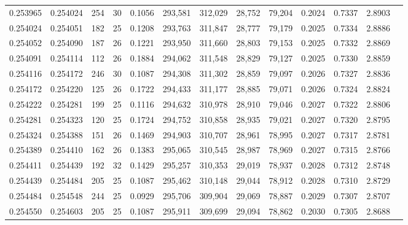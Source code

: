 \begin{tabular}{rrrrrrrrrrrrr}
0.253965 & 0.254024 &   254 &  30 &                                     0.1056 & 293,581 & 312,029 &  28,752 &  79,204 & 0.2024 & 0.7337 & 2.8903 \\
0.254024 & 0.254051 &   182 &  25 &                                     0.1208 & 293,763 & 311,847 &  28,777 &  79,179 & 0.2025 & 0.7334 & 2.8886 \\
0.254052 & 0.254090 &   187 &  26 &                                     0.1221 & 293,950 & 311,660 &  28,803 &  79,153 & 0.2025 & 0.7332 & 2.8869 \\
0.254091 & 0.254114 &   112 &  26 &                                     0.1884 & 294,062 & 311,548 &  28,829 &  79,127 & 0.2025 & 0.7330 & 2.8859 \\
0.254116 & 0.254172 &   246 &  30 &                                     0.1087 & 294,308 & 311,302 &  28,859 &  79,097 & 0.2026 & 0.7327 & 2.8836 \\
0.254172 & 0.254220 &   125 &  26 &                                     0.1722 & 294,433 & 311,177 &  28,885 &  79,071 & 0.2026 & 0.7324 & 2.8824 \\
0.254222 & 0.254281 &   199 &  25 &                                     0.1116 & 294,632 & 310,978 &  28,910 &  79,046 & 0.2027 & 0.7322 & 2.8806 \\
0.254281 & 0.254323 &   120 &  25 &                                     0.1724 & 294,752 & 310,858 &  28,935 &  79,021 & 0.2027 & 0.7320 & 2.8795 \\
0.254324 & 0.254388 &   151 &  26 &                                     0.1469 & 294,903 & 310,707 &  28,961 &  78,995 & 0.2027 & 0.7317 & 2.8781 \\
0.254389 & 0.254410 &   162 &  26 &                                     0.1383 & 295,065 & 310,545 &  28,987 &  78,969 & 0.2027 & 0.7315 & 2.8766 \\
0.254411 & 0.254439 &   192 &  32 &                                     0.1429 & 295,257 & 310,353 &  29,019 &  78,937 & 0.2028 & 0.7312 & 2.8748 \\
0.254439 & 0.254484 &   205 &  25 &                                     0.1087 & 295,462 & 310,148 &  29,044 &  78,912 & 0.2028 & 0.7310 & 2.8729 \\
0.254484 & 0.254548 &   244 &  25 &                                     0.0929 & 295,706 & 309,904 &  29,069 &  78,887 & 0.2029 & 0.7307 & 2.8707 \\
0.254550 & 0.254603 &   205 &  25 &                                     0.1087 & 295,911 & 309,699 &  29,094 &  78,862 & 0.2030 & 0.7305 & 2.8688 \\

\end{tabular}
